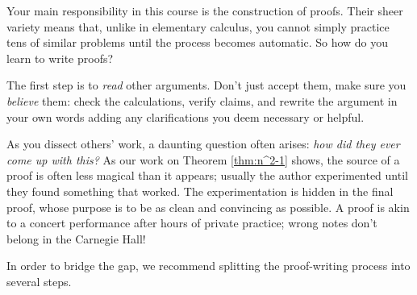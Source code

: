 \label{sec:proofplan}

Your main responsibility in this course is the construction of proofs. Their sheer variety means that, unlike in elementary calculus, you cannot simply practice tens of similar problems until the process becomes automatic. So how do you learn to write proofs?\smallbreak

The first step is to \emph{read} other arguments. Don't just accept them, make sure you \emph{believe} them: check the calculations, verify claims, and rewrite the argument in your own words adding any clarifications you deem necessary or helpful.\smallbreak

As you dissect others' work, a daunting question often arises: \emph{how did they ever come up with this?} As our work on Theorem \ref{thm:n^2-1} shows, the source of a proof is often less magical than it appears; usually the author experimented until they found something that worked. The experimentation is hidden in the final proof, whose purpose is to be as clean and convincing as possible. A proof is akin to a concert performance after hours of private practice; wrong notes don't belong in the Carnegie Hall!\smallbreak

In order to bridge the gap, we recommend splitting the proof-writing process into several steps.

